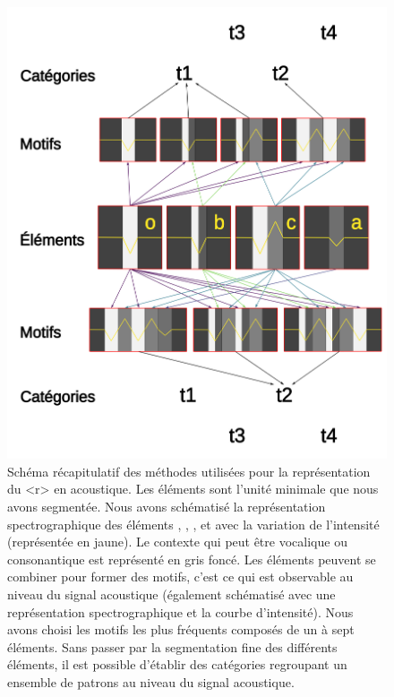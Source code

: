 \begin{landscape}
	\begin{figure}
		\centering
		\includegraphics[width=0.5\linewidth]{substance/images/schema_test}
		\caption[Schéma récapitulatif des méthodes utilisées pour la représentation du <r> en acoustique]{Schéma récapitulatif des méthodes utilisées pour la représentation du <r> en acoustique. Les éléments sont l'unité minimale que nous avons segmentée. Nous avons schématisé la représentation spectrographique des éléments , , , et  avec la variation de l'intensité (représentée en jaune). Le contexte qui peut être vocalique ou consonantique est représenté en gris foncé. Les éléments peuvent se combiner pour former des motifs, c'est ce qui est observable au niveau du signal acoustique (également schématisé avec une représentation spectrographique et la courbe d'intensité). Nous avons choisi les motifs les plus fréquents composés de un à sept éléments. Sans passer par la segmentation fine des différents éléments, il est possible d'établir des catégories regroupant un ensemble de patrons au niveau du signal acoustique.}
		\label{fig:schemarecapacoustics}
	\end{figure}
\end{landscape}
\restoregeometry